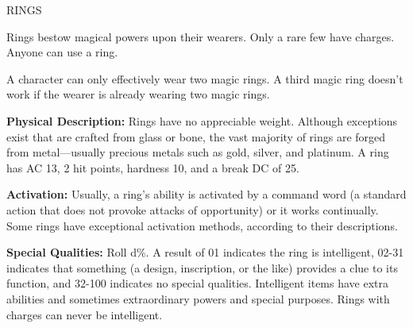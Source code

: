 \documentclass{article}
\begin{document}
\vspace{24pt}
RINGS

Rings bestow magical powers upon their wearers. Only a rare few have charges. Anyone 
can use a ring.

A character can only effectively wear two magic rings. A third magic ring doesn't 
work if the wearer is already wearing two magic rings.

\textbf{Physical Description:} Rings have no appreciable weight. Although exceptions 
exist that are crafted from glass or bone, the vast majority of rings are forged 
from metal---usually precious metals such as gold, silver, and platinum. A ring 
has AC 13, 2 hit points, hardness 10, and a break DC of 25.

\textbf{Activation:} Usually, a ring's ability is activated by a command word (a 
standard action that does not provoke attacks of opportunity) or it works continually. 
Some rings have exceptional activation methods, according to their descriptions.

\textbf{Special Qualities:} Roll d\%. A result of 01 indicates the ring is intelligent, 
02-31 indicates that something (a design, inscription, or the like) provides a 
clue to its function, and 32-100 indicates no special qualities. Intelligent items 
have extra abilities and sometimes extraordinary powers and special purposes. Rings 
with charges can never be intelligent.
\end{document}
